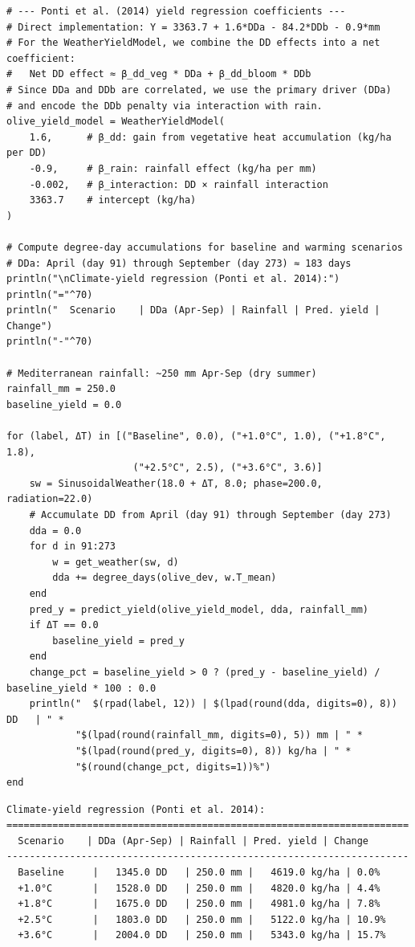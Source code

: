 \begin{verbatim}
# --- Ponti et al. (2014) yield regression coefficients ---
# Direct implementation: Y = 3363.7 + 1.6*DDa - 84.2*DDb - 0.9*mm
# For the WeatherYieldModel, we combine the DD effects into a net coefficient:
#   Net DD effect ≈ β_dd_veg * DDa + β_dd_bloom * DDb
# Since DDa and DDb are correlated, we use the primary driver (DDa)
# and encode the DDb penalty via interaction with rain.
olive_yield_model = WeatherYieldModel(
    1.6,      # β_dd: gain from vegetative heat accumulation (kg/ha per DD)
    -0.9,     # β_rain: rainfall effect (kg/ha per mm)
    -0.002,   # β_interaction: DD × rainfall interaction
    3363.7    # intercept (kg/ha)
)

# Compute degree-day accumulations for baseline and warming scenarios
# DDa: April (day 91) through September (day 273) ≈ 183 days
println("\nClimate-yield regression (Ponti et al. 2014):")
println("="^70)
println("  Scenario    | DDa (Apr-Sep) | Rainfall | Pred. yield | Change")
println("-"^70)

# Mediterranean rainfall: ~250 mm Apr-Sep (dry summer)
rainfall_mm = 250.0
baseline_yield = 0.0

for (label, ΔT) in [("Baseline", 0.0), ("+1.0°C", 1.0), ("+1.8°C", 1.8),
                      ("+2.5°C", 2.5), ("+3.6°C", 3.6)]
    sw = SinusoidalWeather(18.0 + ΔT, 8.0; phase=200.0, radiation=22.0)
    # Accumulate DD from April (day 91) through September (day 273)
    dda = 0.0
    for d in 91:273
        w = get_weather(sw, d)
        dda += degree_days(olive_dev, w.T_mean)
    end
    pred_y = predict_yield(olive_yield_model, dda, rainfall_mm)
    if ΔT == 0.0
        baseline_yield = pred_y
    end
    change_pct = baseline_yield > 0 ? (pred_y - baseline_yield) / baseline_yield * 100 : 0.0
    println("  $(rpad(label, 12)) | $(lpad(round(dda, digits=0), 8)) DD   | " *
            "$(lpad(round(rainfall_mm, digits=0), 5)) mm | " *
            "$(lpad(round(pred_y, digits=0), 8)) kg/ha | " *
            "$(round(change_pct, digits=1))%")
end
\end{verbatim}




\begin{verbatim}
Climate-yield regression (Ponti et al. 2014):
======================================================================
  Scenario    | DDa (Apr-Sep) | Rainfall | Pred. yield | Change
----------------------------------------------------------------------
  Baseline     |   1345.0 DD   | 250.0 mm |   4619.0 kg/ha | 0.0%
  +1.0°C       |   1528.0 DD   | 250.0 mm |   4820.0 kg/ha | 4.4%
  +1.8°C       |   1675.0 DD   | 250.0 mm |   4981.0 kg/ha | 7.8%
  +2.5°C       |   1803.0 DD   | 250.0 mm |   5122.0 kg/ha | 10.9%
  +3.6°C       |   2004.0 DD   | 250.0 mm |   5343.0 kg/ha | 15.7%
\end{verbatim}




